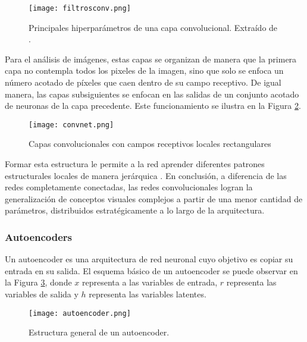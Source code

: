 \begin{figure}[H]
  \centering{}
  \texttt{[image: filtrosconv.png]}
  \caption{Principales hiperparámetros de una capa convolucional. Extraído de \cite{lagartija}.}
  \label{fig:variables_conv}
\end{figure}


Para el análisis de imágenes, estas capas se organizan de manera que la primera capa no contempla todos los pixeles de la imagen, sino que solo se enfoca un número acotado de píxeles que caen dentro de su campo receptivo. De igual manera, las capas subsiguientes se enfocan en las salidas de un conjunto acotado de neuronas de la capa precedente. Este funcionamiento se ilustra en la Figura \ref{fig:convnet}. 

\begin{figure}[H]
  \centering{}
  \texttt{[image: convnet.png]}
  \caption{Capas convolucionales con campos receptivos locales rectangulares}
  \label{fig:convnet}
\end{figure}

Formar esta estructura le permite a la red aprender diferentes patrones estructurales locales de manera jerárquica \cite{lagartija}. En conclusión, a diferencia de las redes completamente conectadas, las redes convolucionales logran la generalización de conceptos visuales complejos a partir de una menor cantidad de parámetros, distribuidos estratégicamente a lo largo de la arquitectura.  

\subsubsection{Autoencoders}

Un autoencoder es una arquitectura de red neuronal cuyo objetivo es copiar su entrada en su salida. El esquema básico de un autoencoder se puede observar en la Figura \ref{fig:autoencoder}, donde $x$ representa a las variables de entrada, $r$ representa las variables de salida y $h$ representa las variables latentes. 

\begin{figure}[H]
	\centering{}
	\texttt{[image: autoencoder.png]}
	\caption{Estructura general de un autoencoder.}
	\label{fig:autoencoder}
\end{figure}

